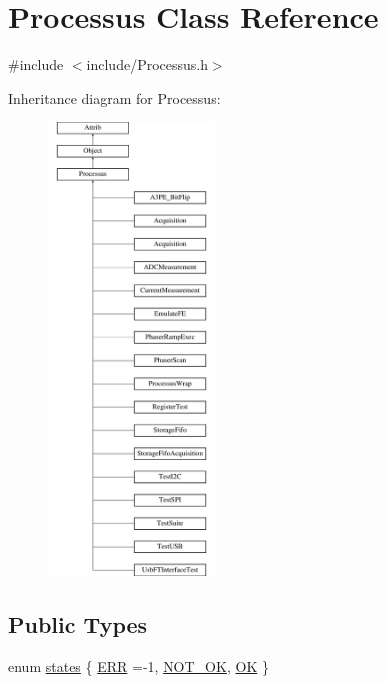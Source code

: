 \hypertarget{classProcessus}{}\section{Processus Class Reference}
\label{classProcessus}


{\ttfamily \#include $<$include/\+Processus.\+h$>$}

Inheritance diagram for Processus\+:\begin{figure}[H]
\begin{center}
\leavevmode
\includegraphics[height=12.000000cm]{classProcessus}
\end{center}
\end{figure}
\subsection*{Public Types}
\begin{DoxyCompactItemize}
\item 
enum \hyperlink{classProcessus_a36278773bd98f2d5612fea40c7774821}{states} \{ \hyperlink{classProcessus_a36278773bd98f2d5612fea40c7774821adaf73ad5d0a09f952d0f18dbbe1c7493}{E\+RR} =-\/1, 
\hyperlink{classProcessus_a36278773bd98f2d5612fea40c7774821a629082f49d6e8df6b6da2b8fbb9d80fb}{N\+O\+T\+\_\+\+OK}, 
\hyperlink{classProcessus_a36278773bd98f2d5612fea40c7774821af77c64124fa175f28200166fff165ea2}{OK}
 \}
\end{DoxyCompactItemize}
